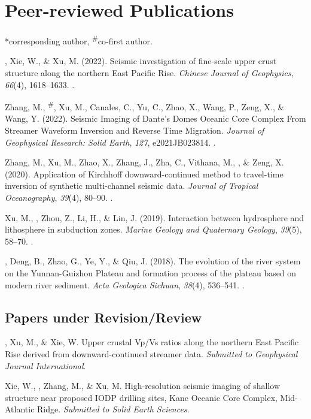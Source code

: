 \section{Peer-reviewed Publications}
\newcommand{\CS}{*} %
\newcommand{\CF}{\textsuperscript{\#}} %

\CS corresponding author, \CF co-first author.
\begin{etaremune}
\item
    \Di, Xie, W., \& Xu, M. (2022).
    Seismic investigation of fine-scale upper crust structure along the northern East Pacific Rise.
    \textit{Chinese Journal of Geophysics}, \textit{66}(4), 1618--1633.
    .
\item
    Zhang, M., \Di\CF, Xu, M., Canales, C., Yu, C., Zhao, X., Wang, P., Zeng, X., \& Wang, Y. (2022).
    Seismic Imaging of Dante's Domes Oceanic Core Complex From Streamer Waveform Inversion and Reverse Time Migration.
    \textit{Journal of Geophysical Research: Solid Earth}, \textit{127}, e2021JB023814.
    .
\item
    Zhang, M., Xu, M., Zhao, X., Zhang, J., Zha, C., Vithana, M., \Di, \& Zeng, X. (2020).
    Application of Kirchhoff downward-continued method to travel-time inversion of synthetic multi-channel seismic data.
    \textit{Journal of Tropical Oceanography}, \textit{39}(4), 80--90.
    .
\item
    Xu, M., \Di, Zhou, Z., Li, H., \& Lin, J. (2019).
    Interaction between hydrosphere and lithosphere in subduction zones.
    \textit{Marine Geology and Quaternary Geology}, \textit{39}(5), 58--70.
    .
\item
    \Di, Deng, B., Zhao, G., Ye, Y., \& Qiu, J. (2018).
    The evolution of the river system on the Yunnan-Guizhou Plateau and formation process of the plateau based on modern river sediment.
    \textit{Acta Geologica Sichuan}, \textit{38}(4), 536--541.
    .
\end{etaremune}

\subsection*{Papers under Revision/Review}
\begin{etaremune}
    \item
    \Di, Xu, M., \& Xie, W.
    Upper crustal Vp/Vs ratios along the northern East Pacific Rise derived from downward-continued streamer data.
    \textit{Submitted to Geophysical Journal International}.
\item
    Xie, W., \Di, Zhang, M., \&  Xu, M.
    High-resolution seismic imaging of shallow structure near proposed IODP drilling sites, Kane Oceanic Core Complex, Mid-Atlantic Ridge.
    \textit{Submitted to Solid Earth Sciences}.
\end{etaremune}

